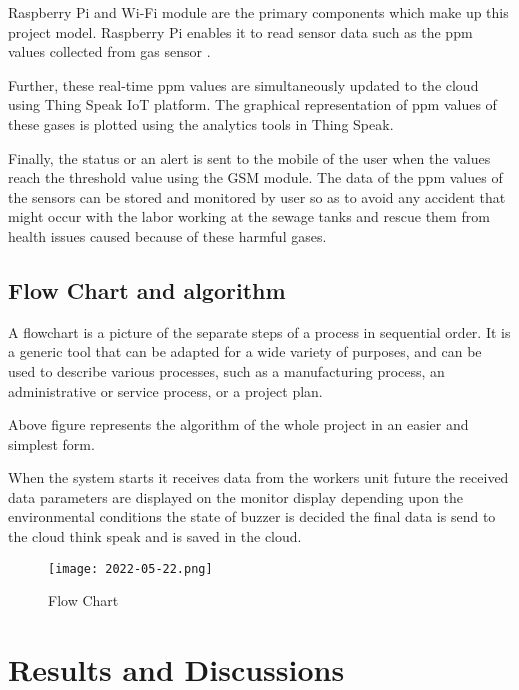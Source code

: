 \documentclass[12pt,a4paper]{report}
\begin{document}
\noindent 
{Raspberry Pi and Wi-Fi module are the primary components which make up this project model. Raspberry Pi enables it to read sensor data such as the ppm values collected from gas sensor . }

\noindent 
{Further, these real-time ppm values are simultaneously updated to the cloud using Thing Speak IoT platform. The graphical representation of ppm values of these gases is plotted using the analytics tools in Thing Speak.}

\noindent 
{ Finally, the status or an alert is sent to the mobile of the user when the values reach the threshold value using the GSM module. The data of the ppm values of the sensors can be stored and monitored by user so as to avoid any accident that might occur with the labor working at the sewage tanks and rescue them from health issues caused because of these harmful gases.}

\noindent 


\section{ Flow Chart and algorithm}

\noindent 


\noindent 


\noindent 

\noindent 

\noindent A flowchart is a picture of the separate steps of a process in sequential order. It is a generic tool that can be adapted for a wide variety of purposes, and can be used to describe various processes, such as a manufacturing process, an administrative or service process, or a project plan.

\noindent Above figure represents the algorithm of the whole project in an easier and simplest form. 

\noindent When the system starts it receives data from the workers unit future the received data parameters are displayed on the monitor display depending upon the environmental conditions the state of buzzer is decided the final data is send to the cloud think speak and is saved in the cloud.

\noindent 
\begin{figure}[htp]
    \texttt{[image: 2022-05-22.png]}
    \caption{Flow Chart}
\end{figure}


\newpage

\chapter{Results and Discussions}
\end{document}
